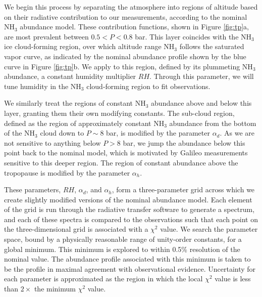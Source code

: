 \documentclass{article}
\begin{document}
	We begin this process by separating the atmosphere into regions of altitude based on their radiative contribution to our measurements, according to the nominal NH$_{3}$ abundance model.
	These contribution functions, shown in Figure \ref{fig:tp}a, are most prevalent between $0.5 < P < 0.8$ bar.
	This layer coincides with the NH$_{3}$ ice cloud-forming region, over which altitude range NH$_{3}$ follows the saturated vapor curve, as indicated by the nominal abundance profile shown by the blue curve in Figure \ref{fig:tp}b.
	We apply to this region, defined by its plummeting NH$_{3}$ abundance, a constant humidity multiplier $RH$.
	Through this parameter, we will tune humidity in the NH$_{3}$ cloud-forming region to fit observations.

	We similarly treat the regions of constant NH$_{3}$ abundance above and below this layer, granting them their own modifying constants.
	The sub-cloud region, defined as the region of approximately constant NH$_{3}$ abundance from the bottom of the NH$_{3}$ cloud down to $P \sim 8$ bar, is modified by the parameter $\alpha_{d}$.
	As we are not sensitive to anything below $P > 8$ bar, we jump the abundance below this point back to the nominal model, which is motivated by Galileo measurements sensitive to this deeper region.
	The region of constant abundance above the tropopause is modified by the parameter $\alpha_{h}$.

	These parameters, $RH$, $\alpha_{d}$, and $\alpha_{h}$, form a three-parameter grid across which we create slightly modified versions of the nominal abundance model.
	Each element of the grid is run through the radiative transfer software to generate a spectrum, and each of these spectra is compared to the observations such that each point on the three-dimensional grid is associated with a $\chi^{2}$ value.
	We search the parameter space, bound by a physically reasonable range of unity-order constants, for a global minimum. This minimum is explored to within 0.5\% resolution of the nominal value.
	The abundance profile associated with this minimum is taken to be the profile in maximal agreement with observational evidence. Uncertainty for each parameter is approximated as the region in which the local $\chi^{2}$ value is less than $2\times$ the minimum $\chi^{2}$ value.
\end{document}
